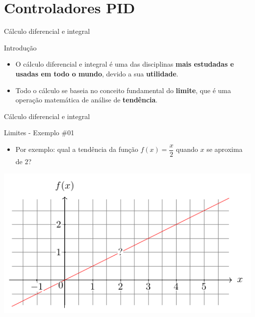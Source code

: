\section{Controladores PID}


\begin{frame}{Cálculo diferencial e integral}
	\begin{block}{Introdução}
		\begin{itemize}
			\item O cálculo diferencial e integral é uma das disciplinas \textbf{mais estudadas e usadas em todo o mundo}, devido a sua \textbf{utilidade}.
			\item Todo o cálculo se baseia no conceito fundamental do \textbf{limite}, que é uma operação matemática de análise de \textbf{tendência}.
		\end{itemize}
	\end{block}
\end{frame}


\begin{frame}{Cálculo diferencial e integral}
	\begin{block}{Limites - Exemplo \#01}
		\begin{itemize}
			\item Por exemplo: qual a tendência da função $ f(x)=\dfrac{x}{2} $ quando $ x $ se aproxima de $ 2 $?
		\end{itemize}
	\end{block}
	
	
	\centering
	\includegraphics[width=0.8\linewidth]{Figuras/Ch13/lim1}
\end{frame}


